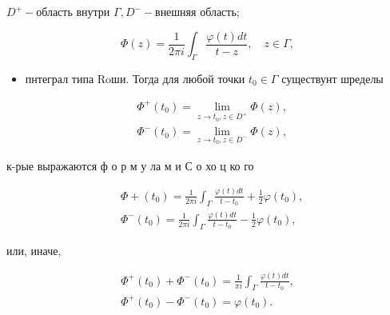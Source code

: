 \documentclass[10pt]{article}
\begin{document}
$D^{+}-$область внутри $\Gamma, D^{-}-$внешняя область;



\[

\Phi(z)=\frac{1}{2 \pi i} \int_{\Gamma} \frac{\varphi(t) d t}{t-z}, \quad z \in \Gamma,

\]



\begin{itemize}

  \item пнтеграл типа Roши. Тогда для любой точки $t_{0} \in \Gamma$ существунт шределы

\end{itemize}



\[

\begin{aligned}

& \Phi^{+}\left(t_{0}\right)=\lim _{z \rightarrow t_{0}, z \in D^{+}} \Phi(z), \\

& \Phi^{-}\left(t_{0}\right)=\lim _{z \rightarrow t_{0}, z \in D^{-}} \Phi(z),

\end{aligned}

\]



к-рые выражаются ф о р м у ла м и С о хо ц ко го



\[

\begin{aligned}

& \Phi+\left(t_{0}\right)=\frac{1}{2 \pi i} \int_{\Gamma} \frac{\varphi(t) d t}{t-t_{0}}+\frac{1}{2} \varphi\left(t_{0}\right), \\

& \Phi^{-}\left(t_{0}\right)=\frac{1}{2 \pi i} \int_{\Gamma} \frac{\varphi(t) d t}{t-t_{0}}-\frac{1}{2} \varphi\left(t_{0}\right),

\end{aligned}

\]



или, иначе,



\[

\begin{gathered}

\Phi^{+}\left(t_{0}\right)+\Phi^{-}\left(t_{0}\right)=\frac{1}{\pi i} \int_{\Gamma} \frac{\varphi(t) d t}{t-t_{0}}, \\

\Phi^{+}\left(t_{0}\right)-\Phi^{-}\left(t_{0}\right)=\varphi\left(t_{0}\right) .

\end{gathered}

\]
\end{document}
